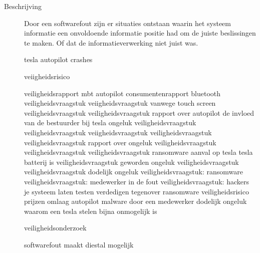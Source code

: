 \begin{description}
\item[Beschrijving]


Door een softwarefout zijn er situaties ontstaan waarin het systeem informatie een onvoldoende informatie positie had om de juiste beslissingen te maken. Of dat de informatieverwerking niet juist was.


tesla autopilot crashes

\cite{teslaFDSCrash}
\cite{teslaCrashesCauses}
\cite{teslacrashOvervieuw}
\cite{tesladeaths}
veiigheidsrisico

\cite{evan01042019teslaautopilotIntersection}
\cite{testVehicleSafetyReport}
veiligheidsrapport mbt autopilot
\cite{lambert31062020q2safetyreport}
consumentenrapport
bluetooth veiligheidsvraagstuk
\cite{wiredBloutoothHackTesla}
veiigheidsvraagstuk vanwege touch screen
\cite{preston14012021NHTSATeslaRecall}
veiligheidsvraagstuk
\cite{cio25112020belgianTeslaHack}
veiligheidsvraagstuk
rapport over autopilot
\cite{templeton06092019HTSBReportTesla}
de invloed van de bestuurder bij tesla ongeluk
veiligheidsvraagstuk
\cite{darkReading17112020TeslaBackup}
veiligheidsvraagstuk
\cite{leyden23032020TeslaInterfaceHack}
veiigheidsvraagstuk
\cite{huddlestonjr03042019ChineseTeslaHack}
veiligheidsvraagstuk
veiligheidsvraagstuk
\cite{heilweil26022020teslaAutopilot}
rapport over ongeluk
veiligheidsvraagstuk
veiligheidsvraagstuk
\cite{blanco04102019NHTSATesla}
veiligheidsvraagstuk
ransomware aanval op tesla
tesla batterij is veiligheidsvraagstuk geworden
\cite{mitchell01072020teslabatterycooling}
ongeluk
\cite{bbc26022020AutopilotCrash}
veiligheidsvraagstuk
veiligheidsvraagstuk
\cite{stumpff04052020TeslaPersonalData}
dodelijk ongeluk
\cite{levin08062018teslaautopilotsafety}
veiligheidsvraagstuk: ransomware
veiligheidsvraagstuk: medewerker in de fout
\cite{cbrook06082021TeslaInsideDataThreft}
\cite{shilling25022021Tesla}
veiligheidsvraagstuk: hackers je systeem laten testen
verdedigen tegenover ransomware
veiligheidsrisico
prijzen omlaag
autopilot
\cite{randall05112019modelSurvey}
malware door een medewerker
dodelijk ongeluk
\cite{fottrell03092018TeslaSecurityChecks}
waarom een tesla stelen bijna onmogelijk is



veiligheidsonderzoek



softwarefout maakt diestal mogelijk



\end{description}
